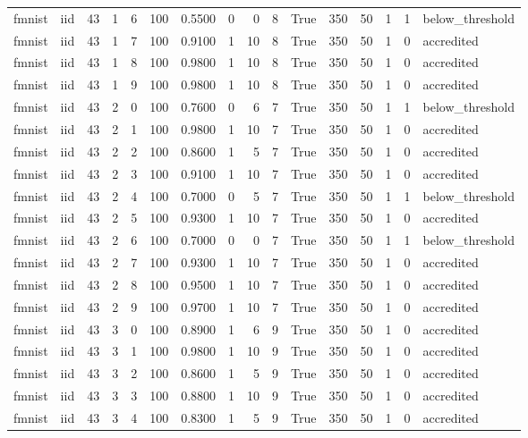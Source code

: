 \begin{tabular}{llrrrrrrrrrrrrrl}
fmnist & iid & 43 & 1 & 6 & 100 & 0.5500 & 0 & 0 & 8 & True & 350 & 50 & 1 & 1 & below\_threshold \\
fmnist & iid & 43 & 1 & 7 & 100 & 0.9100 & 1 & 10 & 8 & True & 350 & 50 & 1 & 0 & accredited \\
fmnist & iid & 43 & 1 & 8 & 100 & 0.9800 & 1 & 10 & 8 & True & 350 & 50 & 1 & 0 & accredited \\
fmnist & iid & 43 & 1 & 9 & 100 & 0.9800 & 1 & 10 & 8 & True & 350 & 50 & 1 & 0 & accredited \\
fmnist & iid & 43 & 2 & 0 & 100 & 0.7600 & 0 & 6 & 7 & True & 350 & 50 & 1 & 1 & below\_threshold \\
fmnist & iid & 43 & 2 & 1 & 100 & 0.9800 & 1 & 10 & 7 & True & 350 & 50 & 1 & 0 & accredited \\
fmnist & iid & 43 & 2 & 2 & 100 & 0.8600 & 1 & 5 & 7 & True & 350 & 50 & 1 & 0 & accredited \\
fmnist & iid & 43 & 2 & 3 & 100 & 0.9100 & 1 & 10 & 7 & True & 350 & 50 & 1 & 0 & accredited \\
fmnist & iid & 43 & 2 & 4 & 100 & 0.7000 & 0 & 5 & 7 & True & 350 & 50 & 1 & 1 & below\_threshold \\
fmnist & iid & 43 & 2 & 5 & 100 & 0.9300 & 1 & 10 & 7 & True & 350 & 50 & 1 & 0 & accredited \\
fmnist & iid & 43 & 2 & 6 & 100 & 0.7000 & 0 & 0 & 7 & True & 350 & 50 & 1 & 1 & below\_threshold \\
fmnist & iid & 43 & 2 & 7 & 100 & 0.9300 & 1 & 10 & 7 & True & 350 & 50 & 1 & 0 & accredited \\
fmnist & iid & 43 & 2 & 8 & 100 & 0.9500 & 1 & 10 & 7 & True & 350 & 50 & 1 & 0 & accredited \\
fmnist & iid & 43 & 2 & 9 & 100 & 0.9700 & 1 & 10 & 7 & True & 350 & 50 & 1 & 0 & accredited \\
fmnist & iid & 43 & 3 & 0 & 100 & 0.8900 & 1 & 6 & 9 & True & 350 & 50 & 1 & 0 & accredited \\
fmnist & iid & 43 & 3 & 1 & 100 & 0.9800 & 1 & 10 & 9 & True & 350 & 50 & 1 & 0 & accredited \\
fmnist & iid & 43 & 3 & 2 & 100 & 0.8600 & 1 & 5 & 9 & True & 350 & 50 & 1 & 0 & accredited \\
fmnist & iid & 43 & 3 & 3 & 100 & 0.8800 & 1 & 10 & 9 & True & 350 & 50 & 1 & 0 & accredited \\
fmnist & iid & 43 & 3 & 4 & 100 & 0.8300 & 1 & 5 & 9 & True & 350 & 50 & 1 & 0 & accredited \\

\end{tabular}
